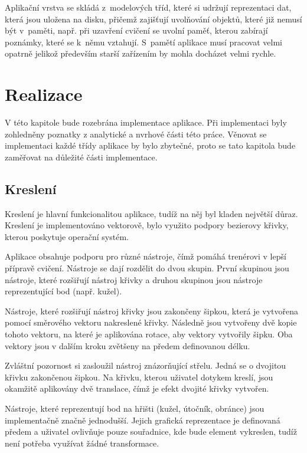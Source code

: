 \documentclass[thesis=B,czech]{FITthesis}[2012/06/26]
\begin{document}
	Aplikační vrstva se skládá z~modelových tříd, které si udržují reprezentaci dat, která jsou uložena na disku, přičemž zajišťují uvolňování objektů, které již nemusí být v~paměti, např. při uzavření cvičení se uvolní paměť, kterou zabírají poznámky, které se k~němu vztahují. S~pamětí aplikace musí pracovat velmi opatrně jelikož především starší zařízením by mohla docházet velmi rychle.

\chapter{Realizace}

	V této kapitole bude rozebrána implementace aplikace. Při implementaci byly zohledněny poznatky z analytické a nvrhové části této práce. Věnovat se implementaci každé třídy aplikace by bylo zbytečné, proto se tato kapitola bude zaměřovat na důležité části implementace.

	\section{Kreslení}

	Kreslení je hlavní funkcionalitou aplikace, tudíž na něj byl kladen největší důraz. Kreslení je implementováno vektorově, bylo využito podpory bezierovy křivky, kterou poskytuje operační systém.

	Aplikace obsahuje podporu pro různé nástroje, čímž pomáhá trenérovi v lepší přípravě cvičení. Nástroje se dají rozdělit do dvou skupin. První skupinou jsou nástroje, které rozšiřují nástroj křivky a druhou skupinou jsou nástroje reprezentující bod (např. kužel).

	Nástroje, které rozšiřují nástroj křivky jsou zakončeny šipkou, která je vytvořena pomocí směrového vektoru nakreslené křivky. Následně jsou vytvořeny dvě kopie tohoto vektoru, na které je aplikována rotace, aby vektory vytvořily šipku. Oba vektory jsou v dalším kroku zvětšeny na předem definovanou délku.

	Zvláštní pozornost si zasloužil nástroj znázorňující střelu. Jedná se o dvojitou křivku zakončenou šipkou. Na křivku, kterou uživatel dotykem kreslí, jsou okamžitě aplikovány dvě translace, čímž je efekt dvojité křivky vytvořen.

	Nástroje, které reprezentují bod na hřišti (kužel, útočník, obránce) jsou implementačně značně jednodušší. Jejich grafická reprezentace je definovaná předem a uživatel ovlivňuje pouze souřadnice, kde bude element vykreslen, tudíž není potřeba využívat žádné transformace.
\end{document}
